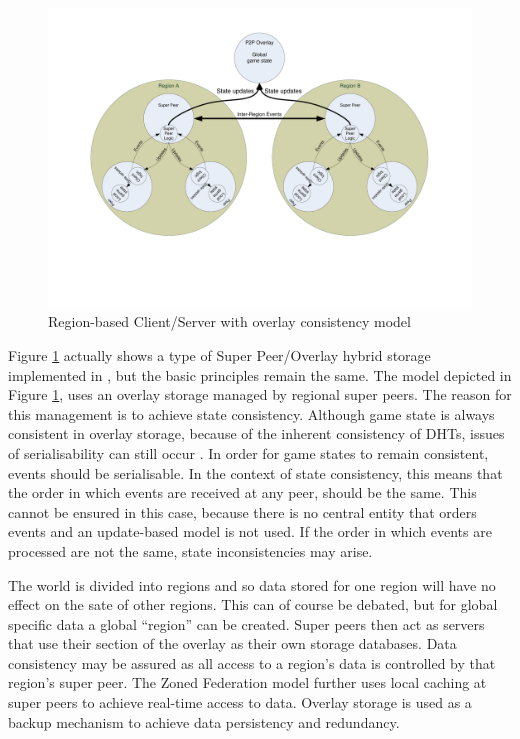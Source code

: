 \documentclass[10pt,a4paper,journal,cspaper,compsoc]{IEEEtran}
\begin{document}
\begin{figure}[htbp]
 \centering
 \includegraphics[clip=true, viewport=2cm 5cm 27cm 19.5cm, width=\textwidth]{region_based_CS_CM_P2PO}
 \caption{Region-based Client/Server with overlay consistency model}
 \label{fig_cs_region_o_cm}
\end{figure}
%
 Figure \ref{fig_cs_region_o_cm} actually shows a type of Super Peer/Overlay hybrid storage implemented in \cite{zoned_federation}, but the
basic principles remain the same. The model depicted in Figure \ref{fig_cs_region_o_cm}, uses an overlay storage managed by regional super peers. The
reason for this management is to achieve state consistency. Although game state is always consistent in overlay storage, because of the inherent
consistency of DHTs, issues of serialisability can still occur \cite{zoned_federation}. In order for game states to remain consistent, events should
be serialisable. In the context of state consistency, this means that the order in which events are received at any peer, should be the same. This
cannot be ensured in this case, because there is no central entity that orders events and an update-based model is not used. If the order in which
events are processed are not the same, state inconsistencies may arise.

The world is divided into regions and so data stored for one region will have no effect on the sate of other regions. This can of course be debated,
but for global specific data a global ``region'' can be created. Super peers then act as servers that use their section of the overlay as their own
storage databases. Data consistency may be assured as all access to a region's data is controlled by that region's super peer. The Zoned Federation
model further uses local caching at super peers to achieve real-time access to data. Overlay storage is used as a backup mechanism to achieve data
persistency and redundancy.
\end{document}
